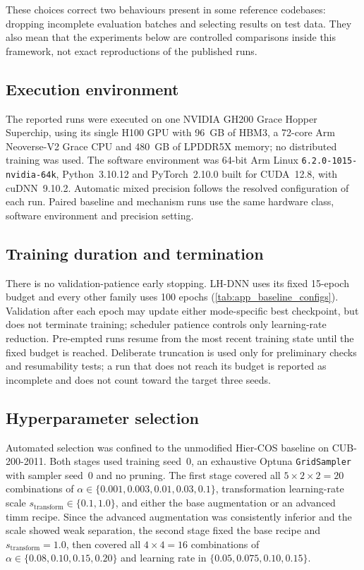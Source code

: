 These choices correct two behaviours present in some reference codebases:
dropping incomplete evaluation batches and selecting results on test data. They
also mean that the experiments below are controlled comparisons inside this
framework, not exact reproductions of the published runs.

\subsection{Execution environment}
\label{ssec:design_environment}

The reported runs were executed on one NVIDIA GH200 Grace Hopper Superchip,
using its single H100 GPU with 96~GB of HBM3, a 72-core Arm Neoverse-V2 Grace
CPU and 480~GB of LPDDR5X memory; no distributed training was used. The
software environment was 64-bit Arm Linux
\texttt{6.2.0-1015-nvidia-64k}, Python~3.10.12 and PyTorch~2.10.0 built for
CUDA~12.8, with cuDNN~9.10.2. Automatic mixed precision follows the resolved
configuration of each run. Paired baseline and mechanism runs use the same
hardware class, software environment and precision setting.

\subsection{Training duration and termination}
\label{ssec:design_termination}

There is no validation-patience early stopping. LH-DNN uses its fixed 15-epoch
budget and every other family uses 100 epochs (\cref{tab:app_baseline_configs}).
Validation after each epoch may update either mode-specific best checkpoint,
but does not terminate training; scheduler patience controls only learning-rate
reduction. Pre-empted runs resume from the most recent training state until the
fixed budget is reached. Deliberate truncation is used only for preliminary
checks and resumability tests; a run that does not reach its budget is reported
as incomplete and does not count toward the target three seeds.

\subsection{Hyperparameter selection}
\label{ssec:design_hyperparameters}

Automated selection was confined to the unmodified Hier-COS baseline on
CUB-200-2011. Both stages used training seed~0, an exhaustive Optuna
\texttt{GridSampler} with sampler seed~0 and no pruning. The first stage covered
all $5\times2\times2=20$ combinations of
$\alpha\in\{0.001,0.003,0.01,0.03,0.1\}$, transformation learning-rate scale
$s_{\mathrm{transform}}\in\{0.1,1.0\}$, and either the base augmentation or an
advanced timm recipe. Since the advanced augmentation was consistently inferior
and the scale showed weak separation, the second stage fixed the base recipe and
$s_{\mathrm{transform}}=1.0$, then covered all $4\times4=16$ combinations of
$\alpha\in\{0.08,0.10,0.15,0.20\}$ and learning rate in
$\{0.05,0.075,0.10,0.15\}$.

